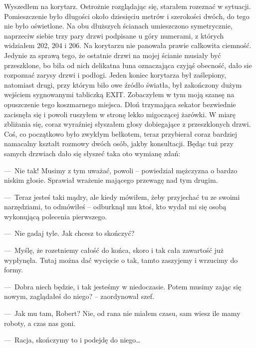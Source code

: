 Wyszedłem na korytarz. Ostrożnie rozglądając się, starałem rozeznać w sytuacji. Pomieszczenie było długości około dziesięciu metrów i szerokości dwóch, do tego nie było oświetlone. Na obu dłuższych ścianach umieszczono symetrycznie, naprzeciw siebie trzy pary drzwi podpisane u góry numerami, z których widziałem 202, 204 i 206. Na korytarzu nie panowała prawie całkowita ciemność. Jedynie za sprawą tego, że ostatnie drzwi na mojej ścianie musiały być przeszklone, bo biła od nich delikatna łuna oznaczająca czyjąś obecność, dało sie rozpoznać zarysy drzwi i podłogi.  Jeden koniec korytarza był zaślepiony, natomiast drugi, przy którym biło owe źródło światła, był zakończony dużym wejściem sygnowanymi tabliczką EXIT. Zobaczyłem w tym moją szansę na opuszczenie tego koszmarnego miejsca. Dłoń trzymająca sekator bezwiednie zacisnęła się i powoli ruszyłem w stronę lekko migoczącej żarówki. W miarę zbliżania się, coraz wyraźniej słyszałem głosy dobiegające z przeszklonych drzwi. Coś, co początkowo było zwykłym bełkotem, teraz przybierał coraz bardziej namacalny kształt rozmowy dwóch osób, jakby konsultacji. Będąc tuż przy samych drzwiach dało się słyszeć taka oto wymianę zdań:

---~Nie tak! Musimy z tym uważać, powoli – powiedział mężczyzna o bardzo niskim głosie. Sprawiał wrażenie mającego przewagę nad tym drugim. 

---~Teraz jesteś taki mądry, ale kiedy mówiłem, żeby przyjechać tu ze swoimi narzędziami, to odmówiłeś – odburknął mu ktoś, kto wydał mi się osobą wykonującą polecenia pierwszego. 

---~Nie gadaj tyle. Jak chcesz to skończyć? 

---~Myślę, że rozetniemy całość do końca, skoro i tak cała zawartość już wypłynęła. Tutaj można dać wycięcie o tak, tamto zaszyjemy i wrzucimy do formy. 

---~Dobra niech będzie, i tak jesteśmy w niedoczasie. Potem musimy zając się nowym, zaglądałeś do niego? – zaordynował szef.

---~Jak mu tam, Robert? Nie, od rana nie miałem czasu, sam wiesz ile mamy roboty, a czas nas goni. 

---~Racja, skończymy to i podejdę do niego… 


